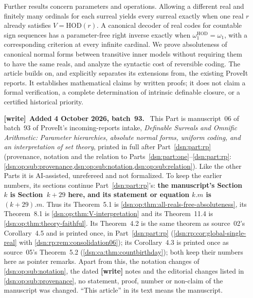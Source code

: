\documentclass[11pt,a4paper]{article}
\numberwithin{equation}{section}
\theoremstyle{definition}
\theoremstyle{remark}
\newcommand{\HOD}{\mathrm{HOD}}
\newenvironment{writenote}[1][]{\par\medskip\begingroup\small\noindent\textbf{[write]}\if\relax\detokenize{#1}\relax\else~\textbf{#1.}\fi~\ignorespaces}{\par\endgroup\medskip}
\begin{document}
Further results concern parameters and operations.  Allowing a different
real and finitely many ordinals for each surreal yields every surreal
exactly when one real \(r\) already satisfies \(V=\HOD(r)\).  A canonical
decoder of real codes for countable sign sequences has a parameter-free
right inverse exactly when \(\omega_1^{\HOD}=\omega_1\), with a corresponding
criterion at every infinite cardinal.  We prove absoluteness of canonical
normal forms between transitive inner models without requiring them to
have the same reals, and analyze the syntactic cost of reversible coding.
The article builds on, and explicitly separates its extensions from, the
existing ProveIt reports.  It establishes mathematical claims by written
proofs; it does not claim a formal verification, a complete determination
of intrinsic definable closure, or a certified historical priority.

\begin{writenote}[Added 4 October 2026, batch~93]
This Part is manuscript~06 of batch~93 of ProveIt's incoming-reports intake,
\emph{Definable Surreals and Omnific Arithmetic: Parameter hierarchies,
absolute normal forms, uniform coding, and an interpretation of set theory},
printed in full after Part~\ref{dsn:part:rp} (provenance, notation and the
relation to Parts~\ref{dsn:part:one}--\ref{dsn:part:rp}:
\cref{dsn:op:sub:provenance,dsn:op:sub:notation,dsn:op:sub:relation}). Like
the other Parts it is AI-assisted, unrefereed and not formalized. To keep the
earlier numbers, its sections continue Part~\ref{dsn:part:rp}'s: \textbf{the
manuscript's Section~$k$ is Section~$k+29$ here, and its statement or equation
$k.m$ is $(k+29).m$}. Thus its Theorem~5.1 is
\cref{dsn:op:thm:all-reals-free-absoluteness}, its Theorem~8.1 is
\cref{dsn:op:thm:V-interpretation} and its Theorem~11.4 is
\cref{dsn:op:thm:theory-faithful}. Its Theorem~4.2 is the same theorem as
source~02's Corollary~4.5 and is printed once, in Part~\ref{dsn:part:rp}
(\cref{dsn:rp:cor:global-single-real} with \cref{dsn:rp:rem:consolidation06});
its Corollary~4.3 is printed once as source~05's Theorem~5.2
(\cref{dsn:ca:thm:countbirthday}); both keep their numbers here as pointer
remarks. Apart from this, the notation changes of \cref{dsn:op:sub:notation},
the dated \textbf{[write]} notes and the editorial changes listed in
\cref{dsn:op:sub:provenance}, no statement, proof, number or non-claim of the
manuscript was changed. ``This article'' in its text means the manuscript.
\end{writenote}
\end{document}
